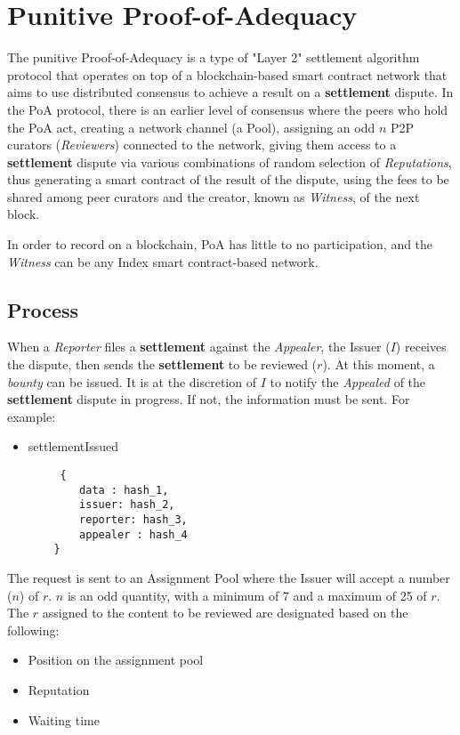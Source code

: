 \documentclass{article}
\begin{document}
\section{Punitive Proof-of-Adequacy}

The punitive Proof-of-Adequacy is a type of "Layer 2" settlement algorithm protocol that operates on top of a blockchain-based smart contract network that aims to use distributed consensus to achieve a result on a \textbf{settlement} dispute. In the PoA protocol, there is an earlier level of consensus where the peers who hold the PoA act, creating a network channel (a Pool), assigning an odd $n$ P2P curators (\textit{Reviewers}) connected to the network, giving them access to a \textbf{settlement} dispute via various combinations of random selection of \textit{Reputations}, thus generating a smart contract of the result of the dispute, using the fees to be shared among peer curators and the creator, known as \textit{Witness}, of the next block.

In order to record on a blockchain, PoA has little to no participation, and the \textit{Witness} can be any Index smart contract-based network.

\subsection{Process}

When a \textit{Reporter} files a \textbf{settlement} against the \textit{Appealer}, the Issuer ($I$) receives the dispute, then sends the \textbf{settlement} to be reviewed ($r$). At this moment, a \textit{bounty} can be issued. It is at the discretion of $I$ to notify the \textit{Appealed} of the \textbf{settlement} dispute in progress. If not, the information must be sent. For example:

\begin{itemize}
    \item settlementIssued
    \begin{verbatim}
     {
        data : hash_1,
        issuer: hash_2,
        reporter: hash_3,
        appealer : hash_4
    }
    \end{verbatim}
\end{itemize}
The request is sent to an Assignment Pool where the Issuer will accept a number ($n$) of $r$. $n$ is an odd quantity, with a minimum of 7 and a maximum of 25 of $r$. The $r$ assigned to the content to be reviewed are designated based on the following:

\begin{itemize}
    \item Position on the assignment pool
    \item Reputation
    \item Waiting time
\end{itemize}
\end{document}

